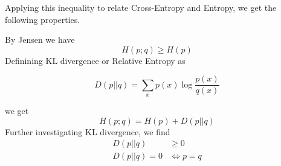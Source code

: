 Applying this inequality to relate Cross-Entropy and Entropy, we get the following properties.

    By Jensen we have \[H(p; q) \geq H(p)\]
    Definining KL divergence or Relative Entropy as
    \begin{mainbox}{}
    \[D(p || q) = \sum_{x} p(x) \log \frac{p(x)}{q(x)}\]
    \end{mainbox}
    we get
    \[H(p; q) = H(p) + D(p || q)\]
    Further investigating KL divergence, we find 
    \begin{align}
        D(p||q) &\geq 0\\
        D(p||q) = 0 &\iff p = q
    \end{align}
    


